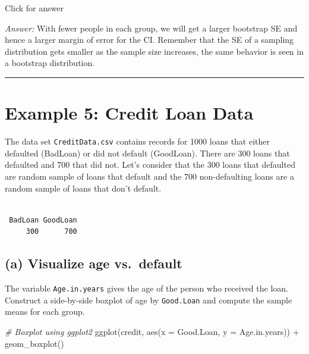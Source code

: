 \documentclass[
]{book}
\newenvironment{Shaded}{\begin{snugshade}}{\end{snugshade}}
\newcommand{\AttributeTok}[1]{\textcolor[rgb]{0.77,0.63,0.00}{#1}}
\newcommand{\CommentTok}[1]{\textcolor[rgb]{0.56,0.35,0.01}{\textit{#1}}}
\newcommand{\FunctionTok}[1]{\textcolor[rgb]{0.00,0.00,0.00}{#1}}
\newcommand{\NormalTok}[1]{#1}
\newcommand{\OtherTok}[1]{\textcolor[rgb]{0.56,0.35,0.01}{#1}}
\newcommand{\SpecialCharTok}[1]{\textcolor[rgb]{0.00,0.00,0.00}{#1}}
\newcommand{\StringTok}[1]{\textcolor[rgb]{0.31,0.60,0.02}{#1}}
\begin{document}
Click for answer

\emph{Answer:} With fewer people in each group, we will get a larger bootstrap SE and hence a larger margin of error for the CI. Remember that the SE of a sampling distribution gets smaller as the sample size increases, the same behavior is seen in a bootstrap distribution.

\begin{center}\rule{0.5\linewidth}{0.5pt}\end{center}

\hypertarget{example-5-credit-loan-data}{%
\section{Example 5: Credit Loan Data}\label{example-5-credit-loan-data}}

The data set \texttt{CreditData.csv} contains records for 1000 loans that either defaulted (BadLoan) or did not default (GoodLoan). There are 300 loans that defaulted and 700 that did not. Let's consider that the 300 loans that defaulted are random sample of loans that default and the 700 non-defaulting loans are a random sample of loans that don't default.

\begin{Shaded}
\end{Shaded}

\begin{verbatim}

 BadLoan GoodLoan 
     300      700 
\end{verbatim}

\hypertarget{a-visualize-age-vs.-default}{%
\subsection{(a) Visualize age vs.~default}\label{a-visualize-age-vs.-default}}

The variable \texttt{Age.in.years} gives the age of the person who received the loan. Construct a side-by-side boxplot of age by \texttt{Good.Loan} and compute the sample means for each group.

\begin{Shaded}
\begin{Highlighting}[]
\CommentTok{\# Boxplot using ggplot2}
\FunctionTok{ggplot}\NormalTok{(credit, }\FunctionTok{aes}\NormalTok{(}\AttributeTok{x =}\NormalTok{ Good.Loan, }\AttributeTok{y =}\NormalTok{ Age.in.years)) }\SpecialCharTok{+}
  \FunctionTok{geom\_boxplot}\NormalTok{()}
\end{Highlighting}
\end{Shaded}
\end{document}
